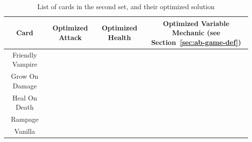 \begin{table}[t]
\centering
\begin{tabular}{||c c c c||} 
 \hline
 Card & Optimized Attack & Optimized Health & Optimized Variable Mechanic (see Section~\ref{sec:ab-game-def})\\ [0.5ex]
 \hline
 Friendly Vampire &  &  &  \\
 \hline
 Grow On Damage &  &  &  \\
 \hline
 Heal On Death &  &  & \\
 \hline
 Rampage &  &  &  \\ 
 \hline
 Vanilla &  &  &  \\
 \hline
\end{tabular}
\caption{List of cards in the second set, and their optimized solution}
\label{tab:second_set}
\end{table}



